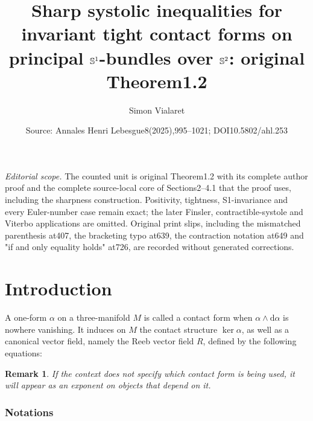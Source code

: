 \documentclass[10pt,a4paper]{amsart}
\title[Sharp systolic inequality]{Sharp systolic inequalities for invariant tight contact forms on principal $\mathbb{S}^1$-bundles over $\mathbb{S}^2$: original Theorem1.2}
\author{Simon Vialaret}
\date{Source: Annales Henri Lebesgue8(2025),995--1021; DOI10.5802/ahl.253}
\newcommand{\rmd}{\mathrm{d}}
\newtheorem{rema}[theo]{Remark}
\theoremstyle{definition}\newtheorem{defi}[theo]{Definition}
\begin{document}
\maketitle
\noindent\textit{Editorial scope.} The counted unit is original Theorem1.2 with its complete author proof and the complete source-local core of Sections2--4.1 that the proof uses, including the sharpness construction. Positivity, tightness, S1-invariance and every Euler-number case remain exact; the later Finsler, contractible-systole and Viterbo applications are omitted. Original print slips, including the mismatched parenthesis at407, the bracketing typo at639, the contraction notation at649 and "if and only equality holds" at726, are recorded without generated corrections.
\section{Introduction}

A one-form $\alpha$ on a three-manifold $M$ is called a contact form when $\alpha \wedge \rmd  \alpha$ is nowhere vanishing. It induces on $M$ the contact structure $\ker \alpha$, as well as a canonical vector field, namely the Reeb vector field $R$, defined by the following equations:

\begin{rema}
If the context does not specify which contact form is being used, it will appear as an exponent on objects that depend on it.
\end{rema}

\subsubsection{Notations}\label{par:notations}
\end{document}
